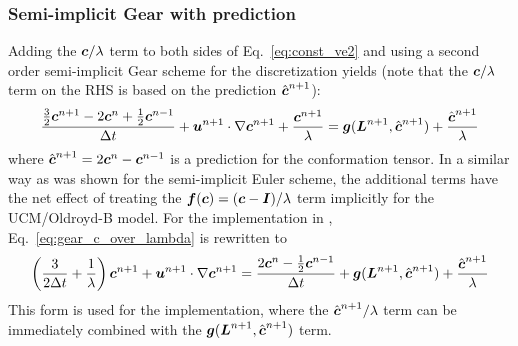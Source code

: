 \subsubsection{Semi-implicit Gear with prediction}
Adding the $\boldsymbol{c}/\lambda$ term to both sides of Eq.~\eqref{eq:const_ve2} 
and using a second order semi-implicit Gear scheme for the discretization
yields
(note that the $\boldsymbol{c}/\lambda$ term on the RHS is based on the 
prediction $\hat{\boldsymbol{c}}^{n+1}$):
\begin{equation}
  \frac{\frac32 \boldsymbol{c}^{n+1}-2\boldsymbol{c}^n+\frac12 \boldsymbol{c}^{n-1}}{\Delta t}+
  \boldsymbol{u}^{n+1}\cdot\nabla\boldsymbol{c}^{n+1}+\frac{\boldsymbol{c}^{n+1}}{\lambda}=
\boldsymbol{g}(\boldsymbol{L}^{n+1},\hat{\boldsymbol{c}}^{n+1})+
  \frac{\hat{\boldsymbol{c}}^{n+1}}{\lambda}
  \label{eq:gear_c_over_lambda}
\end{equation}
where $\hat{\boldsymbol{c}}^{n+1}=2\boldsymbol{c}^n-\boldsymbol{c}^{n-1}$ is a prediction for the 
conformation tensor. In a similar way as was shown for the semi-implicit 
Euler scheme, the additional terms have the net effect of treating the
$\boldsymbol{f}(\boldsymbol{c})=(\boldsymbol{c} - \boldsymbol{I})/\lambda$ term implicitly for the
UCM/Oldroyd-B model.
For the implementation in 
\tfem, Eq.~\eqref{eq:gear_c_over_lambda} is rewritten to
\begin{equation}
 \left(\frac{3}{2\Delta t}+\frac{1}{\lambda}\right)\boldsymbol{c}^{n+1} +
   {\boldsymbol{u}}^{n+1}\cdot\nabla\boldsymbol{c}^{n+1}=
  \frac{2\boldsymbol{c}^{n}-\frac12\boldsymbol{c}^{n-1}}{\Delta t} +
    \boldsymbol{g}(\boldsymbol{L}^{n+1},\hat{\boldsymbol{c}}^{n+1}) +
       \frac{\hat{\boldsymbol{c}}^{n+1}}{\lambda}  \label{eq:gear_implementation}
\end{equation}
This form is used for the implementation, where the $\hat{\boldsymbol{c}}^{n+1}/\lambda$ term can be immediately combined with the $\boldsymbol{g}(\boldsymbol{L}^{n+1},\hat{\boldsymbol{c}}^{n+1})$ term.


